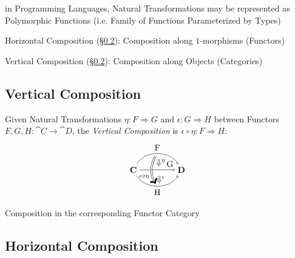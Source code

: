 in Programming Languages, Natural Transformations may be represented
as Polymorphic Functions (i.e. Family of Functions Parameterized by
Types)

Horizontal Composition (\S\ref{sec:horizontal_composition}):
Composition along $1$-morphisms (Functors)

Vertical Composition (\S\ref{sec:horizontal_composition}):
Composition along Objects (Categories)



\subsection{Vertical Composition}\label{sec:vertical_composition}

Given Natural Transformations $\eta : F \Rightarrow G$ and $\epsilon :
G \Rightarrow H$ between Functors $F,G,H : \cat{C} \rightarrow
\cat{D}$, the \emph{Vertical Composition} is $\epsilon\circ\eta : F
\Rightarrow H$:
\[
  \begin{tikzpicture}
    \node (C) at (-1,0) {$\cat{C}$};
    \node (D) at (1,0) {$\cat{D}$};
    \node (N) at (0,0.3) {$\;\;\;\Downarrow^\eta$};
    \node (M) at (0,-0.4) {$\;\;\;\Downarrow^\epsilon$};
    \node (F) at (0,0.7) {};
    \node (H) at (0,-0.7) {};
    \draw[->,bend left=60] (C) to node [above] {F} (D);
    \draw[->] (C) to node [above] {\quad\quad\quad G} (D);
    \draw[->,bend right=60] (C) to node [below] {H} (D);
    \draw[->,bend right=30,double distance=1.5pt] (F) to
      node [left,pos=0.75] {$_{\epsilon\circ\eta}$} (H);
  \end{tikzpicture}
\]

Composition in the corresponding Functor Category



\subsection{Horizontal Composition}\label{sec:horizontal_composition}


